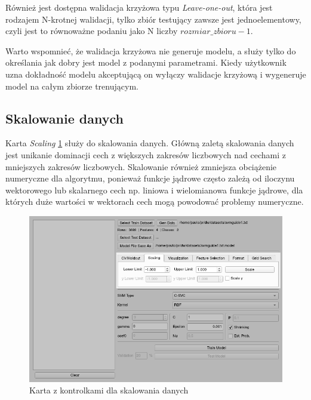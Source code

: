\documentclass[paper=a4, fontsize=11pt]{scrartcl} %
\numberwithin{equation}{section} %
\numberwithin{figure}{section} %
\begin{document}
    \par Również jest dostępna walidacja krzyżowa typu \textit{Leave-one-out}, która jest
    rodzajem N-krotnej walidacji, tylko zbiór testujący zawsze jest jednoelementowy, czyli jest
    to równoważne podaniu jako N liczby $rozmiar\_zbioru - 1$.
    \par Warto wspomnieć, że walidacja krzyżowa nie generuje modelu, a służy tylko do
    określania jak dobry jest model z podanymi parametrami. Kiedy użytkownik uzna dokładność
    modelu akceptującą on wyłączy walidacje krzyżową i wygeneruje model na całym zbiorze
    trenującym.

\newpage
\subsection{Skalowanie danych}
    \par Karta \textit{Scaling} \ref{fig:scaling} służy do skalowania danych. Główną zaletą
    skalowania danych jest unikanie dominacji cech z większych zakresów liczbowych nad cechami
    z mniejszych zakresów liczbowych. Skalowanie również zmniejsza obciążenie numeryczne dla
    algorytmu, ponieważ funkcje jądrowe często zależą od iloczynu wektorowego lub skalarnego
    cech np.  liniowa i wielomianowa funkcje jądrowe, dla których duże wartości w wektorach
    cech mogą powodować problemy numeryczne.

    \begin{figure}[H]
        \begin{center}
            \includegraphics[scale=0.7]{./img/svm_app_scaling.png}
            \caption{Karta z kontrolkami dla skalowania danych}
            \label{fig:scaling}
        \end{center}
    \end{figure}
\end{document}
